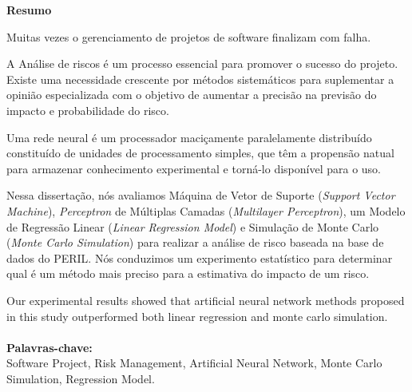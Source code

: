 \begin{flushbottom}
\begin{flushleft}
{\huge \textbf{Resumo}}
\linebreak
\end{flushleft}
Muitas vezes o gerenciamento de projetos de software finalizam com falha.

A Análise de riscos é um processo essencial para promover o sucesso do projeto. Existe uma necessidade crescente por métodos sistemáticos para suplementar a opinião especializada com o objetivo de aumentar a precisão na previsão do impacto e probabilidade do risco.

Uma rede neural é um processador maciçamente paralelamente distribuído constituído de unidades de processamento simples, que têm a propensão natual para armazenar conhecimento experimental e torná-lo disponível para o uso.

Nessa dissertação, nós avaliamos Máquina de Vetor de Suporte (\textit{Support Vector Machine}), \textit{Perceptron} de Múltiplas Camadas (\textit{Multilayer Perceptron}), um Modelo de Regressão Linear (\textit{Linear Regression Model}) e Simulação de Monte Carlo (\textit{Monte Carlo Simulation}) para realizar a análise de risco baseada na base de dados do PERIL. Nós conduzimos um experimento estatístico para determinar qual é um método mais preciso para a estimativa do impacto de um risco.

Our experimental results showed that artificial neural network methods proposed in this study outperformed both linear regression and monte carlo simulation.
\\
\\
\textbf{Palavras-chave:} \\ Software Project, Risk Management, Artificial Neural Network, Monte Carlo Simulation, Regression Model.\end{flushbottom}
\newpage
